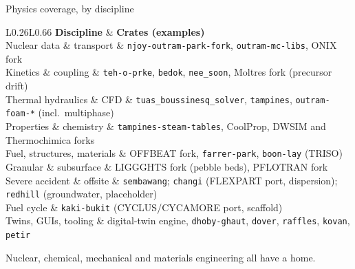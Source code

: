 \documentclass[aspectratio=169]{beamer}
\newcommand{\roadtab}[1]{{\footnotesize\setlength{\tabcolsep}{4pt}#1}}
\begin{document}
\begin{frame}{Physics coverage, by discipline}
    \roadtab{
    \begin{tabular}{L{0.26\textwidth}L{0.66\textwidth}}
        \toprule
        \textbf{Discipline} & \textbf{Crates (examples)} \\
        \midrule
        Nuclear data \& transport & \texttt{njoy-outram-park-fork},
            \texttt{outram-mc-libs}, ONIX fork \\
        Kinetics \& coupling & \texttt{teh-o-prke}, \texttt{bedok},
            \texttt{nee\_soon}, Moltres fork (precursor drift) \\
        Thermal hydraulics \& CFD & \texttt{tuas\_boussinesq\_solver},
            \texttt{tampines}, \texttt{outram-foam-*} (incl.\ multiphase) \\
        Properties \& chemistry & \texttt{tampines-steam-tables}, CoolProp,
            DWSIM and Thermochimica forks \\
        Fuel, structures, materials & OFFBEAT fork, \texttt{farrer-park},
            \texttt{boon-lay} (TRISO) \\
        Granular \& subsurface & LIGGGHTS fork (pebble beds), PFLOTRAN fork \\
        Severe accident \& offsite & \texttt{sembawang}; \texttt{changi}
            (FLEXPART port, dispersion); \texttt{redhill} (groundwater,
            placeholder) \\
        Fuel cycle & \texttt{kaki-bukit} (CYCLUS/CYCAMORE port, scaffold) \\
        Twins, GUIs, tooling & digital-twin engine, \texttt{dhoby-ghaut},
            \texttt{dover}, \texttt{raffles}, \texttt{kovan}, \texttt{petir} \\
        \bottomrule
    \end{tabular}}

    \medskip
    \footnotesize
    Nuclear, chemical, mechanical and materials engineering all have a home.
\end{frame}
\end{document}
